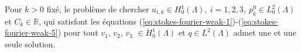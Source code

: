 


\begin{proposition}\label{prop:existance-unicite-1}
  Pour $k > 0$ fixé, le problème de chercher $u_{i,k}\in H_0^1(\Lambda),\ i =
  1,2,3,\ p_k^0 \in L_0^2(\Lambda)$ et $C_k\in\mathbb R$, qui satisfont
  les équations
  (\ref{eq:stokes-fourier-weak-1})-(\ref{eq:stokes-fourier-weak-5})
  pour tout $v_1$, $v_2$, $v_3$ $\in H_0^1(\Lambda)$ et $q\in
  L^2(\Lambda)$ admet une et une seule solution.
\end{proposition}

